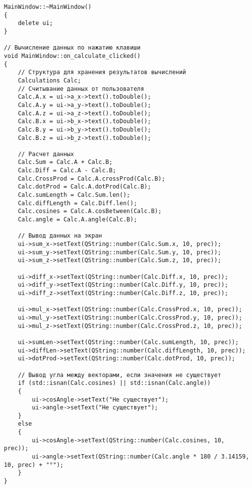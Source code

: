 \begin{landscape}
\begin{lstlisting}[caption={mainwindow.cpp}]
MainWindow::~MainWindow()
{
    delete ui;
}

// Вычисление данных по нажатию клавиши
void MainWindow::on_calculate_clicked()
{
    // Структура для хранения результатов вычислений
    Calculations Calc;
    // Считывание данных от пользователя
    Calc.A.x = ui->a_x->text().toDouble();
    Calc.A.y = ui->a_y->text().toDouble();
    Calc.A.z = ui->a_z->text().toDouble();
    Calc.B.x = ui->b_x->text().toDouble();
    Calc.B.y = ui->b_y->text().toDouble();
    Calc.B.z = ui->b_z->text().toDouble();

    // Расчет данных
    Calc.Sum = Calc.A + Calc.B;
    Calc.Diff = Calc.A - Calc.B;
    Calc.CrossProd = Calc.A.crossProd(Calc.B);
    Calc.dotProd = Calc.A.dotProd(Calc.B);
    Calc.sumLength = Calc.Sum.len();
    Calc.diffLength = Calc.Diff.len();
    Calc.cosines = Calc.A.cosBetween(Calc.B);
    Calc.angle = Calc.A.angle(Calc.B);

    // Вывод данных на экран
    ui->sum_x->setText(QString::number(Calc.Sum.x, 10, prec));
    ui->sum_y->setText(QString::number(Calc.Sum.y, 10, prec));
    ui->sum_z->setText(QString::number(Calc.Sum.z, 10, prec));

    ui->diff_x->setText(QString::number(Calc.Diff.x, 10, prec));
    ui->diff_y->setText(QString::number(Calc.Diff.y, 10, prec));
    ui->diff_z->setText(QString::number(Calc.Diff.z, 10, prec));

    ui->mul_x->setText(QString::number(Calc.CrossProd.x, 10, prec));
    ui->mul_y->setText(QString::number(Calc.CrossProd.y, 10, prec));
    ui->mul_z->setText(QString::number(Calc.CrossProd.z, 10, prec));

    ui->sumLen->setText(QString::number(Calc.sumLength, 10, prec));
    ui->diffLen->setText(QString::number(Calc.diffLength, 10, prec));
    ui->dotProd->setText(QString::number(Calc.dotProd, 10, prec));

    // Вывод угла между векторами, если значения не существует
    if (std::isnan(Calc.cosines) || std::isnan(Calc.angle))
    {
        ui->cosAngle->setText("Не существует");
        ui->angle->setText("Не существует");
    }
    else
    {
        ui->cosAngle->setText(QString::number(Calc.cosines, 10, prec));
        ui->angle->setText(QString::number(Calc.angle * 180 / 3.14159, 10, prec) + "°");
    }
}

\end{lstlisting}

\end{landscape}